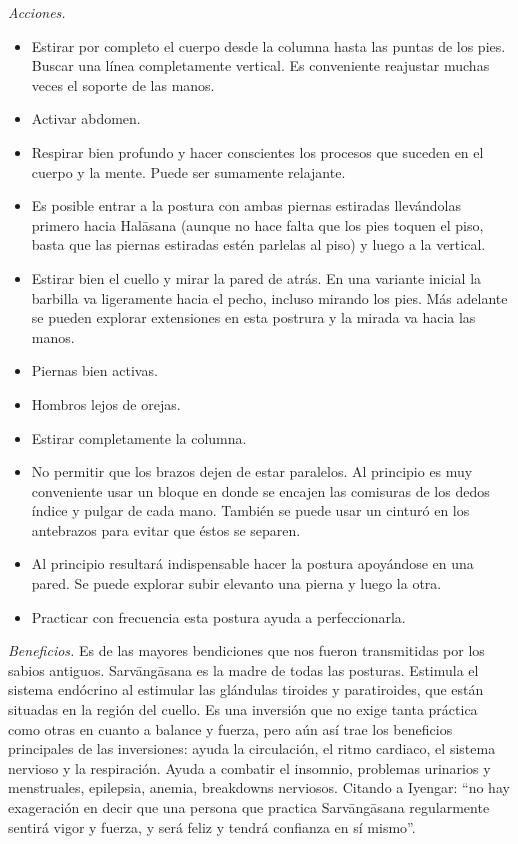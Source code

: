 \emph{Acciones.}
\begin{itemize}
\item Estirar por completo el cuerpo desde la
columna hasta las puntas de los pies. Buscar
una línea completamente vertical. Es
conveniente reajustar muchas veces el soporte
de las manos.
\item Activar abdomen.
\item Respirar bien profundo y hacer
conscientes los procesos que suceden en el
cuerpo y la mente. Puede ser sumamente
relajante.
\item Es posible entrar a la postura con
ambas piernas estiradas llevándolas primero
hacia Halāsana (aunque no hace falta que los
pies toquen el piso, basta que las piernas
estiradas estén parlelas al piso) y luego a
la vertical.
\end{itemize}
\begin{itemize}
\item Estirar bien el cuello y mirar la pared
de atrás. En una variante inicial la barbilla
va ligeramente hacia el pecho, incluso
mirando los pies. Más adelante se pueden
explorar extensiones en esta postrura y la
mirada va hacia las manos.
\item Piernas bien activas.
\item Hombros lejos de orejas.
\item Estirar completamente la columna.
\item No permitir que los brazos dejen de
estar paralelos. Al principio es muy
conveniente usar un bloque en donde se
encajen las comisuras de los dedos índice y
pulgar de cada mano. También se puede usar un
cinturó en los antebrazos para evitar que
éstos se separen.
\item Al principio resultará indispensable
hacer la postura apoyándose en una pared. Se
puede explorar subir elevanto una pierna y
luego la otra.
\item Practicar con frecuencia esta postura
ayuda a perfeccionarla.
\end{itemize}

\emph{Beneficios.} Es de las mayores
bendiciones que nos fueron transmitidas por
los sabios antiguos. Sarvāngāsana es la madre
de todas las posturas. Estimula el sistema
endócrino al estimular las glándulas tiroides
y paratiroides, que están situadas en la
región del cuello. Es una inversión que no
exige tanta práctica como otras en cuanto a
balance y fuerza, pero aún así trae los
beneficios principales de las inversiones:
ayuda la circulación, el ritmo cardiaco, el
sistema nervioso y la respiración. Ayuda a
combatir el insomnio, problemas urinarios y
menstruales, epilepsia, anemia, breakdowns
nerviosos. Citando a Iyengar: ``no hay
exageración en decir que una persona que
practica Sarvāngāsana regularmente sentirá
vigor y fuerza, y será feliz y tendrá
confianza en sí mismo''.

